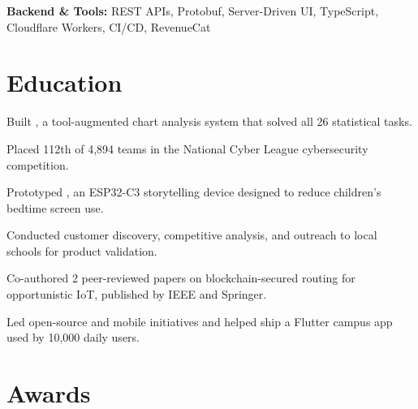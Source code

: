\documentclass{fonts}
\begin{document}
\noindent
\textbf{Backend \& Tools:} REST APIs, Protobuf, Server-Driven UI, TypeScript, Cloudflare Workers, CI/CD, RevenueCat


\section{Education}
\begin{tightemize}
    \item Built , a tool-augmented chart analysis system that solved all 26 statistical tasks.
    \item Placed 112th of 4,894 teams in the National Cyber League cybersecurity competition.
\end{tightemize}


\begin{tightemize}
    \item Prototyped , an ESP32-C3 storytelling device designed to reduce children's bedtime screen use.
    \item Conducted customer discovery, competitive analysis, and outreach to local schools for product validation.
\end{tightemize}


\begin{tightemize}
    \item Co-authored 2 peer-reviewed papers on blockchain-secured routing for opportunistic IoT, published by IEEE and Springer.
    \item Led open-source and mobile initiatives and helped ship a Flutter campus app used by 10,000 daily users.
\end{tightemize}


\section{Awards}
\textbf{}
\end{document}
